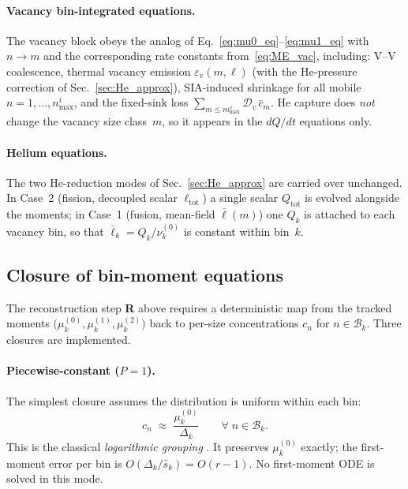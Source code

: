 \paragraph{Vacancy bin-integrated equations.}
The vacancy block obeys the analog of
Eq.~\eqref{eq:mu0_eq}--\eqref{eq:mu1_eq} with $n \to m$ and the
corresponding rate constants from~\eqref{eq:ME_vac}, including:
V--V coalescence, thermal vacancy emission
$\varepsilon_v(m,\ell)$ (with the He-pressure correction of
Sec.~\ref{sec:He_approx}), SIA-induced shrinkage for all mobile
$n = 1, \ldots, n_{\max}^i$, and the fixed-sink loss
$\sum_{m \le m_{\max}^v} \mathcal{D}_v\,\bar{c}_m$. He capture does
\emph{not} change the vacancy size class~$m$, so it appears in the
$dQ/dt$ equations only.

\paragraph{Helium equations.}
The two He-reduction modes of Sec.~\ref{sec:He_approx} are carried over
unchanged. In Case~2 (fission, decoupled scalar $\ell_{\mathrm{tot}}$)
a single scalar $Q_{\mathrm{tot}}$ is evolved alongside the moments;
in Case~1 (fusion, mean-field $\bar{\ell}(m)$) one $Q_k$ is attached
to each vacancy bin, so that
$\bar{\ell}_k = Q_k / \nu_k^{(0)}$ is constant within bin~$k$.

\subsection{Closure of bin-moment equations}
\label{sec:closure}

The reconstruction step \textbf{R} above requires a deterministic map
from the tracked moments $\bigl(\mu_k^{(0)}, \mu_k^{(1)}, \mu_k^{(2)}\bigr)$
back to per-size concentrations $c_n$ for $n \in \mathcal{B}_k$. Three
closures are implemented.

\paragraph{Piecewise-constant ($P{=}1$).}
\label{sec:pc_closure}
The simplest closure assumes the distribution is uniform within each
bin:
\begin{equation}\label{eq:pc_ansatz}
    c_n \;\approx\; \frac{\mu_k^{(0)}}{\Delta_k}
    \qquad \forall\; n \in \mathcal{B}_k.
\end{equation}
This is the classical \emph{logarithmic grouping}
\cite{Golubov2001,Ovcharenko2003,Golubov2007,Kohnert2017,Cui2020}. It
preserves $\mu_k^{(0)}$ exactly; the first-moment error per bin is
$O(\Delta_k/\hat{s}_k) = O(r-1)$. No first-moment ODE is solved in
this mode.

